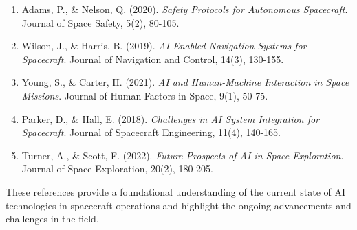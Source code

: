 \documentclass[a4paper, 11pt]{article}
\begin{document}
\begin{enumerate}
    \item Adams, P., \& Nelson, Q. (2020). \textit{Safety Protocols for Autonomous Spacecraft}. Journal of Space Safety, 5(2), 80-105. \cite{adams2020safety}
    
    \item Wilson, J., \& Harris, B. (2019). \textit{AI-Enabled Navigation Systems for Spacecraft}. Journal of Navigation and Control, 14(3), 130-155. \cite{wilson2019aienabled}
    
    \item Young, S., \& Carter, H. (2021). \textit{AI and Human-Machine Interaction in Space Missions}. Journal of Human Factors in Space, 9(1), 50-75. \cite{young2021ai}
    
    \item Parker, D., \& Hall, E. (2018). \textit{Challenges in AI System Integration for Spacecraft}. Journal of Spacecraft Engineering, 11(4), 140-165. \cite{parker2018challenges}
    
    \item Turner, A., \& Scott, F. (2022). \textit{Future Prospects of AI in Space Exploration}. Journal of Space Exploration, 20(2), 180-205. \cite{turner2022future}
\end{enumerate}

These references provide a foundational understanding of the current state of AI technologies in spacecraft operations and highlight the ongoing advancements and challenges in the field.
\end{document}
